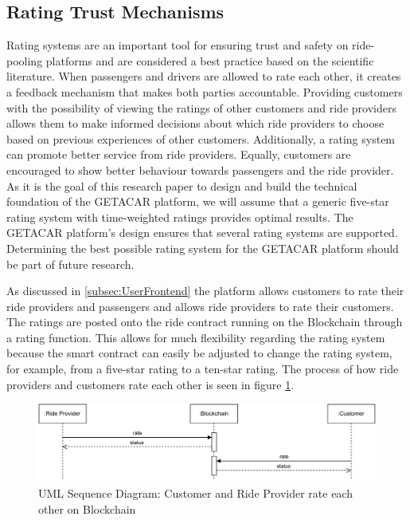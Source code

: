 \subsection{Rating Trust Mechanisms}\label{subsec:RatingTrustMechanisms}
Rating systems are an important tool for ensuring trust and safety on ride-pooling platforms and are considered a best practice based on the scientific literature. When passengers and drivers are allowed to rate each other, it creates a feedback mechanism that makes both parties accountable. Providing customers with the possibility of viewing the ratings of other customers and ride providers allows them to make informed decisions about which ride providers to choose based on previous experiences of other customers. Additionally, a rating system can promote better service from ride providers. Equally, customers are encouraged to show better behaviour towards passengers and the ride provider. As it is the goal of this research paper to design and build the technical foundation of the GETACAR platform, we will assume that a generic five-star rating system with time-weighted ratings provides optimal results. The GETACAR platform's design ensures that several rating systems are supported. Determining the best possible rating system for the GETACAR platform should be part of future research. 

As discussed in \ref{subsec:UserFrontend} the platform allows customers to rate their ride providers and passengers and allows ride providers to rate their customers. The ratings are posted onto the ride contract running on the Blockchain through a rating function. This allows for much flexibility regarding the rating system because the smart contract can easily be adjusted to change the rating system, for example, from a five-star rating to a ten-star rating. The process of how ride providers and customers rate each other is seen in figure \ref{fig:ratingFlow}.
\begin{figure}[h]
    \centering
    \includegraphics[width=\linewidth]{data/6.svg}
    \caption{UML Sequence Diagram: Customer and Ride Provider rate each other on Blockchain}
    \label{fig:ratingFlow}
\end{figure}


